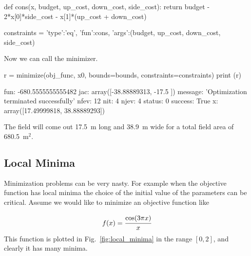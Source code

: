 \begin{ipython}
def cons(x, budget, up_cost, down_cost, side_cost):
    return budget - 2*x[0]*side_cost - x[1]*(up_cost + down_cost)

constraints = {'type':'eq', 'fun':cons,
               'args':(budget, up_cost, down_cost, side_cost)}
\end{ipython}

Now we can call the minimizer.

\begin{ipython}
r = minimize(obj_func, x0, bounds=bounds, constraints=constraints)
print (r)
\end{ipython}
\begin{ioutput}
    fun: -680.5555555555482
    jac: array([-38.88889313, -17.5       ])
message: 'Optimization terminated successfully'
   nfev: 12
    nit: 4  
   njev: 4
 status: 0
success: True
      x: array([17.49999818, 38.88889293])
\end{ioutput}

The field will come out 17.5~m long and 38.9~m wide for a total field area of 680.5~$\textrm{m}^2$.

\subsection{Local Minima}
Minimization problems can be very nasty.
For example when the objective function has local minima the choice of the initial value of the parameters can be critical. 
Assume we would like to minimize an objective function like 

\[
f(x) = \cfrac{\mathrm{cos}(3\pi x)}{x}
\]
This function is plotted in Fig.~\ref{fig:local_minima} in the range $[0, 2]$, and clearly it has many minima. 

